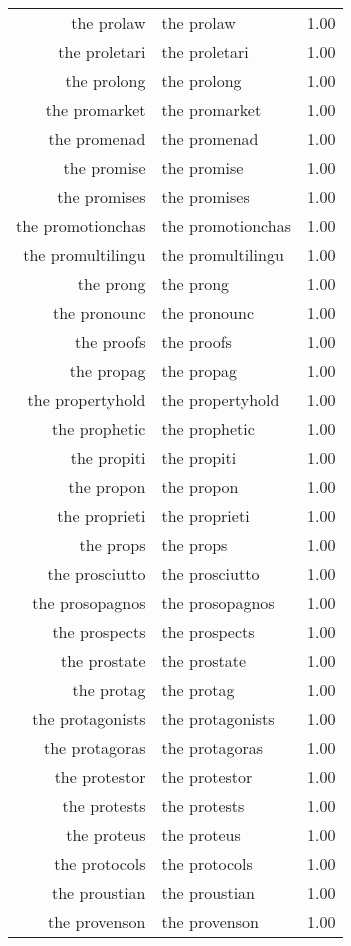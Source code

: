 \begin{table}[ht]
\begin{tabular}{rlr}
  the prolaw & the prolaw & 1.00 \\ 
  the proletari & the proletari & 1.00 \\ 
  the prolong & the prolong & 1.00 \\ 
  the promarket & the promarket & 1.00 \\ 
  the promenad & the promenad & 1.00 \\ 
  the promise & the promise & 1.00 \\ 
  the promises & the promises & 1.00 \\ 
  the promotionchas & the promotionchas & 1.00 \\ 
  the promultilingu & the promultilingu & 1.00 \\ 
  the prong & the prong & 1.00 \\ 
  the pronounc & the pronounc & 1.00 \\ 
  the proofs & the proofs & 1.00 \\ 
  the propag & the propag & 1.00 \\ 
  the propertyhold & the propertyhold & 1.00 \\ 
  the prophetic & the prophetic & 1.00 \\ 
  the propiti & the propiti & 1.00 \\ 
  the propon & the propon & 1.00 \\ 
  the proprieti & the proprieti & 1.00 \\ 
  the props & the props & 1.00 \\ 
  the prosciutto & the prosciutto & 1.00 \\ 
  the prosopagnos & the prosopagnos & 1.00 \\ 
  the prospects & the prospects & 1.00 \\ 
  the prostate & the prostate & 1.00 \\ 
  the protag & the protag & 1.00 \\ 
  the protagonists & the protagonists & 1.00 \\ 
  the protagoras & the protagoras & 1.00 \\ 
  the protestor & the protestor & 1.00 \\ 
  the protests & the protests & 1.00 \\ 
  the proteus & the proteus & 1.00 \\ 
  the protocols & the protocols & 1.00 \\ 
  the proustian & the proustian & 1.00 \\ 
  the provenson & the provenson & 1.00 \\ 

\end{tabular}
\end{table}
